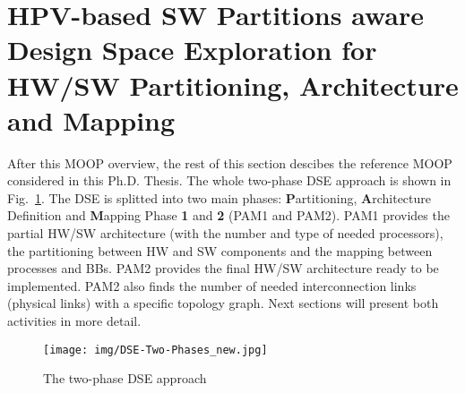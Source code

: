 %
%
%
%
%
%
%
%
%
%
%
%
%
%
%
\section{HPV-based SW Partitions aware Design Space Exploration for HW/SW Partitioning, Architecture and Mapping}\label{refsection1}
%
After this MOOP overview, the rest of this section descibes the reference MOOP considered in this Ph.D. Thesis. The whole two-phase DSE approach is shown in Fig.~\ref{figure4_1}. The DSE is splitted into two main phases: \textbf{P}artitioning, \textbf{A}rchitecture Definition and \textbf{M}apping Phase \textbf{1} and \textbf{2} (PAM1 and PAM2). PAM1 provides the partial HW/SW architecture (with the number and type of needed processors), the partitioning between HW and SW components and the mapping between processes and BBs. PAM2 provides the final HW/SW architecture ready to be implemented. PAM2 also finds the number of needed interconnection links (physical links) with a specific topology graph. Next sections will present both activities in more detail.
%
\begin{figure}[!ht]
\centerline{\texttt{[image: img/DSE-Two-Phases\_new.jpg]}}
\caption{The two-phase DSE approach\label{figure4_1}}
\end{figure}
%

